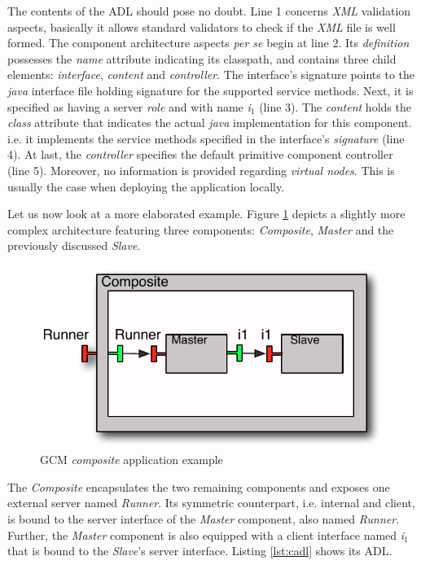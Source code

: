 		
	\noindent The contents of the \ac{ADL} should pose no doubt. Line 1 concerns \textit{XML} validation
	aspects, basically it allows standard validators to check if the \textit{XML} file is well formed.
	The component architecture aspects \textit{per se} begin at line 2. Its \textit{definition} possesses the \textit{name}
	attribute indicating its classpath, and contains three child elements: \textit{interface}, \textit{content} and \textit{controller}. 
	The interface's
	signature points to the \textit{java} interface file holding signature for the supported service methods. Next,
	it is specified as having a server \textit{role} and with name \textit{i$_1$} (line 3). The \textit{content} holds the
	\textit{class} attribute that indicates the actual \textit{java} implementation for this component. i.e. it implements
	the service methods specified in the interface's \textit{signature} (line 4). At last, the \textit{controller} specifies
	the default primitive component controller (line 5).		
		Moreover, no information is provided regarding \textit{virtual nodes}. This is usually the case when deploying
	the application locally.	


	\noindent Let us now look at a more elaborated example. Figure \ref{fig:composite} depicts a slightly more
	complex architecture featuring three components: \textit{Composite}, \textit{Master} and the previously
	discussed \textit{Slave}.

	
		\begin{figure}[H]
		\centering
	   \includegraphics[scale=1]{figures/chapter2/composite.pdf} 	
   		\caption{GCM \textit{composite} application example}
   		\label{fig:composite}
		\end{figure}
	
	
	\noindent The \textit{Composite} encapsulates the two remaining components and exposes one
	external server named \textit{Runner}. Its symmetric counterpart, i.e. internal and client, is
	bound to the server interface of the \textit{Master} component, also named \textit{Runner}. Further,
	the \textit{Master} component is also equipped with a client interface named \textit{i$_1$} that
	is bound to the \textit{Slave}'s server interface. Listing \ref{lst:cadl} shows its \ac{ADL}.
	

